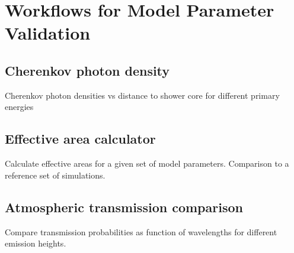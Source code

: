 \section{Workflows for Model Parameter Validation}

\subsection{Cherenkov photon density}

Cherenkov photon densities vs distance to shower core for different primary energies

\subsection{Effective area calculator}

Calculate effective areas for a given set of model parameters. Comparison to a reference set of simulations.

\subsection{Atmospheric transmission comparison}

Compare transmission probabilities as function of wavelengths for different emission heights.